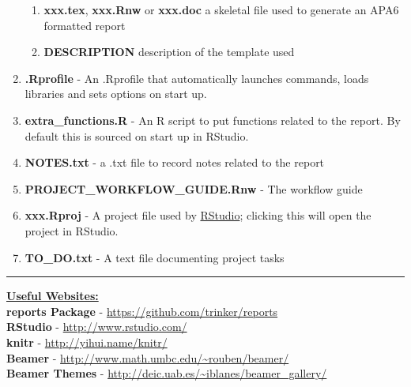 \documentclass{article}\usepackage{graphicx, color}
\begin{document}
\begin{enumerate}
\begin{enumerate}
    \item \textbf{xxx.tex}, \textbf{xxx.Rnw} or \textbf{xxx.doc} a skeletal file used to generate an APA6 formatted report
    \item \textbf{DESCRIPTION} description of the template used
  \end{enumerate} 
  \item \textbf{.Rprofile} - An .Rprofile that automatically launches commands, loads libraries and sets options on start up.
  \item \textbf{extra\_functions.R} - An R script to put functions related to the report.  By default this is sourced on start up in RStudio.  
  \item \textbf{NOTES.txt} - a .txt file to record notes related to the report
  \item \textbf{PROJECT\_WORKFLOW\_GUIDE.Rnw} - The workflow guide
  \item \textbf{xxx.Rproj} - A project file used by \href{http://www.rstudio.com/}{RStudio}; clicking this will open the project in RStudio. 
  \item \textbf{TO\_DO.txt} - A text file documenting project tasks
\end{enumerate}

\vspace{3 mm}
\hrule
\vspace{3 mm}
\noindent \textbf{\underline{Useful Websites:}} \vspace{1.5 mm} \\ 
\textbf{reports Package} - \href{https://github.com/trinker/reports}{https://github.com/trinker/reports}\\ 
\textbf{RStudio} - \href{http://www.rstudio.com/}{http://www.rstudio.com/}\\
\textbf{knitr} - \href{http://yihui.name/knitr/}{http://yihui.name/knitr/}\\
\textbf{Beamer} - \url{http://www.math.umbc.edu/~rouben/beamer/}\\
\textbf{Beamer Themes} - \url{http://deic.uab.es/~iblanes/beamer_gallery/}\\
\end{document}
